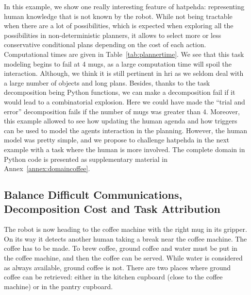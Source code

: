 \documentclass[a4paper,11pt,twoside]{StyleThese}
\begin{document}
In this example, we show one really interesting feature of \acrshort{hatpehda}: representing human knowledge that is not known by the robot. While not being tractable when there are a lot of possibilities, which is expected when exploring all the possibilities in non-deterministic planners, it allows to select more or less conservative conditional plans depending on the cost of each action. Computational times are given in Table~\ref{tab:plannertime}. We see that this task modeling begins to fail at 4 mugs, as a large computation time will spoil the interaction. Although, we think it is still pertinent in \acrshort{hri} as we seldom deal with a large number of objects and long plans. Besides, thanks to the task decomposition being Python functions, we can make a decomposition fail if it would lead to a combinatorial explosion. Here we could have made the ``trial and error'' decomposition fails if the number of mugs was greater than 4. Moreover, this example allowed to see how updating the human agenda and how triggers can be used to model the agents interaction in the  planning.
However, the human model was pretty simple, and we propose to challenge \acrshort{hatpehda} in the next example with a task where the human is more involved. The complete domain in Python code is presented as supplementary material in Annex~\ref{annex:domaincoffee}.

\subsection{Balance Difficult Communications, Decomposition Cost and Task Attribution}
The robot is now heading to the coffee machine with the right mug in its gripper. On its way it detects another human taking a break near the coffee machine. The coffee has to be made. To brew coffee, ground coffee and water must be put in the coffee machine, and then the coffee can be served. While water is considered as always available, ground coffee is not. There are two places where ground coffee can be retrieved: either in the kitchen cupboard (close to the coffee machine) or in the pantry cupboard. 
\end{document}
